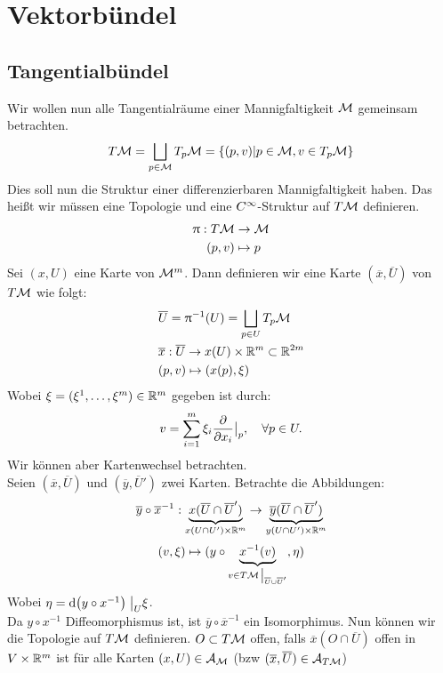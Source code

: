 \chapter{Vektorbündel}
\section{Tangentialbündel}
Wir wollen nun alle Tangentialräume einer Mannigfaltigkeit $\mathcal{M}$ gemeinsam betrachten.
\begin{align}
T\mathcal{M} = \bigsqcup_{p\in \mathcal{M}} T_{p}\mathcal{M} = \{ (p, v) \vert p \in \mathcal{M}, v \in T_{p}\mathcal{M} \} 
\end{align}
Dies soll nun die Struktur einer differenzierbaren Mannigfaltigkeit haben. 
Das heißt wir müssen eine Topologie und eine $C^\infty$-Struktur auf $T\mathcal{M}$ definieren.
\begin{align}
\uppi: T\mathcal{M} &\to \mathcal{M} \\
(p,v) &\mapsto p
\end{align}
Sei $(x, U)$ eine Karte von $\mathcal{M}^m$. 
Dann definieren wir eine Karte $(\overline{x}, \overline{U})$ von $T\mathcal{M}$ wie folgt:
\begin{align}
&\overline{U} = \uppi^{-1}(U) = \bigsqcup_{p\in U} T_{p}\mathcal{M} \\
&\overline{x}: \overline{U} \to x(U) \times \mathbb{R}^m \subset \mathbb{R}^{2m} \\
&(p, v) \mapsto (x(p), \xi)
\end{align}
Wobei $\xi = (\xi^1, \dots, \xi^m) \in \mathbb{R}^m$ gegeben ist durch:
\begin{align}
v = \sum_{i=1}^{m} \xi_i \pdv{x_i} \big\vert_p, \quad \forall p \in U.
\end{align}
Wir können aber Kartenwechsel betrachten.\\
Seien $(\overline{x}, \overline{U})$ und $(\overline{y}, \overline{U}')$ zwei Karten. 
Betrachte die Abbildungen:
\begin{align}
\overline{y} \circ \overline{x}^{-1} : \underbrace{x (\overline{U} \cap \overline{U}')}_{x(U \cap U') \times \mathbb{R}^m} \to \underbrace{\overline{y}(\overline{U} \cap \overline{U}')}_{y(U \cap U') \times \mathbb{R}^m}
\end{align}
\begin{align}
(v,\xi) \mapsto (y \circ \underbrace{x^{-1}(v)}_{v \in T \mfk\eval_{\overline{U} \cup \overline{U}'}}, \eta) 
\end{align}
Wobei $\eta = \dd (y \circ x^{-1})\eval_U \xi$.\\
Da $y\circ x^{-1}$ Diffeomorphismus ist, ist $\overline{y} \circ \overline{x}^{-1}$ ein Isomorphimus.
Nun können wir die Topologie auf $T\mathcal{M}$ definieren.
$O \subset T\mathcal{M}$ offen, falls $\overline{x}(O\cap \overline{U})$ offen in $V \times \mathbb{R}^m$ ist für alle Karten $(x, U) \in \mathcal{A}_{\mathcal{M}}$ (bzw $(\overline{x}, \overline{U}) \in \mathcal{A}_{T\mathcal{M}}$)


